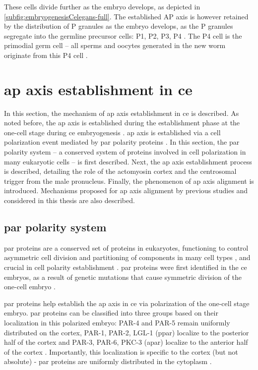These cells divide further as the embryo develops, as depicted in \autoref{subfig:embryogenesisCelegans-full}. The established AP axis is however retained by the distribution of P granules as the embryo develops, as the P granules segregate into the germline precursor cells: P1, P2, P3, P4 \citep{rose2014polarity,strome1989generation}. The P4 cell is the primodial germ cell -- all sperms and oocytes generated in the new worm originate from this P4 cell \citep{rose2014polarity,kimble2005germline}.

\section{\acs{ap} axis establishment in \acs{ce}}\label{sec:ApAxisEstablishment}
In this section, the mechanism of \ac{ap} axis establishment in \ac{ce} is described. As noted before, the \ac{ap} axis is established during the establishment phase at the one-cell stage during \ac{ce} embryogenesis \citep{rose2014polarity}. \ac{ap} axis is established via a cell polarization event mediated by \acs{par} polarity proteins \citep{motegi2013network,hoege2013principles,lang2017proteins}. In this section, the \acs{par} polarity system -- a conserved system of proteins involved in cell polarization in many eukaryotic cells \citep{hoege2013principles} -- is first described. Next, the \ac{ap} axis establishment process is described, detailing the role of the actomyosin cortex and the centrosomal trigger from the male pronucleus. Finally, the phenomenon of \ac{ap} axis alignment is introduced. Mechanisms proposed for \ac{ap} axis alignment by previous studies and considered in this thesis are also described.

\subsection{\acs{par} polarity system}\label{subsec:ParPolarity}
\ac{par} proteins are a conserved set of proteins in eukaryotes, functioning to control asymmetric cell division and partitioning of components in many cell types \citep{goldstein2007proteins,knoblich2001asymmetric}, and crucial in cell polarity establishment \citep{goldstein2007proteins}. \ac{par} proteins were first identified in the \ac{ce} embryos, as a result of genetic mutations that cause symmetric division of the one-cell embryo \citep{guo1995par1,kemphues1988identification}. 

\ac{par} proteins help establish the \ac{ap} axis in \ac{ce} via polarization of the one-cell stage embryo. \ac{par} proteins can be classified into three groups based on their localization in this polarized embryo: PAR-4 and PAR-5 remain uniformly distributed on the cortex, PAR-1, PAR-2, LGL-1 (\ac{ppar}) localize to the posterior half of the cortex and PAR-3, PAR-6, PKC-3 (\ac{apar}) localize to the anterior half of the cortex \citep{motegi2013network}. Importantly, this localization is specific to the cortex (but not absolute) - \ac{par} proteins are uniformly distributed in the cytoplasm \citep{motegi2013network,hoege2013principles}. 

